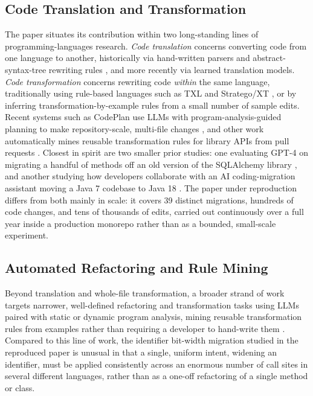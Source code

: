 \subsection{Code Translation and Transformation}
The paper situates its contribution within two long-standing lines of
programming-languages research. \emph{Code translation} concerns
converting code from one language to another, historically via
hand-written parsers and abstract-syntax-tree rewriting rules
\cite{cordy2004txl}, and more recently via learned translation models.
\emph{Code transformation} concerns rewriting code \emph{within} the
same language, traditionally using rule-based languages such as TXL
\cite{cordy2004txl} and Stratego/XT \cite{bravenboer2008stratego}, or
by inferring transformation-by-example rules from a small number of
sample edits. Recent systems such as CodePlan use LLMs with
program-analysis-guided planning to make repository-scale, multi-file
changes \cite{bairi2024codeplan}, and other work automatically mines
reusable transformation rules for library APIs from pull requests
\cite{ramos2023melt}. Closest in spirit are two smaller prior studies:
one evaluating GPT-4 on migrating a handful of methods off an old
version of the SQLAlchemy library \cite{almeida2024library}, and
another studying how developers collaborate with an AI
coding-migration assistant moving a Java 7 codebase to Java 18
\cite{tehrani2024evaluating}. The paper under reproduction differs
from both mainly in scale: it covers 39 distinct migrations, hundreds
of code changes, and tens of thousands of edits, carried out
continuously over a full year inside a production monorepo rather
than as a bounded, small-scale experiment.

\subsection{Automated Refactoring and Rule Mining}
Beyond translation and whole-file transformation, a broader strand of
work targets narrower, well-defined refactoring and transformation
tasks using LLMs paired with static or dynamic program analysis,
mining reusable transformation rules from examples rather than
requiring a developer to hand-write them
\cite{ramos2023melt, bairi2024codeplan}. Compared to this line of
work, the identifier bit-width migration studied in the reproduced
paper is unusual in that a single, uniform intent, widening an
identifier, must be applied consistently across an enormous number of
call sites in several different languages, rather than as a one-off
refactoring of a single method or class.

